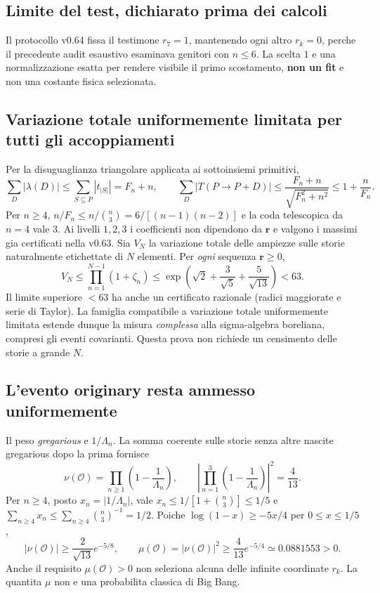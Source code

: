 \documentclass[11pt,a4paper]{article}
\begin{document}
\subsection*{Limite del test, dichiarato prima dei calcoli}
Il protocollo v0.64 fissa il testimone $r_7=1$, mantenendo ogni altro $r_k=0$, perche il precedente audit esaustivo esaminava genitori con $n\le6$. La scelta $1$ e una normalizzazione esatta per rendere visibile il primo scostamento, \textbf{non un fit} e non una costante fisica selezionata.

\clearpage
\subsection*{Variazione totale uniformemente limitata per tutti gli accoppiamenti}
Per la disuguaglianza triangolare applicata ai sottoinsiemi primitivi,
\begin{equation}
\sum_D |\lambda(D)|\le\sum_{S\subseteq P}|t_{|S|}|=F_n+n,\qquad
\sum_D|T(P\to P+D)|\le\frac{F_n+n}{\sqrt{F_n^2+n^2}}\le1+\frac n{F_n}.\tag{FN.4}
\end{equation}
Per $n\ge4$, $n/F_n\le n/\binom n3=6/[(n-1)(n-2)]$ e la coda telescopica da $n=4$ vale $3$. Ai livelli $1,2,3$ i coefficienti non dipendono da $\boldsymbol r$ e valgono i massimi gia certificati nella v0.63. Sia $V_N$ la variazione totale delle ampiezze sulle storie naturalmente etichettate di $N$ elementi. Per \emph{ogni} sequenza $\boldsymbol r\ge0$,
\begin{equation}
\boxed{V_N\le\prod_{n=1}^{N-1}(1+\zeta_n)
\le\exp\!\left(\sqrt2+\frac3{\sqrt5}+\frac5{\sqrt{13}}\right)<63.}\tag{FN.5}
\end{equation}
Il limite superiore $<63$ ha anche un certificato razionale (radici maggiorate e serie di Taylor). La famiglia compatibile a variazione totale uniformemente limitata estende dunque la misura \emph{complessa} alla sigma-algebra boreliana, compresi gli eventi covarianti. Questa prova non richiede un censimento delle storie a grande $N$.

\subsection*{L'evento originary resta ammesso uniformemente}
Il peso \emph{gregarious} e $1/\Lambda_n$. La somma coerente sulle storie senza altre nascite gregarious dopo la prima fornisce
\begin{equation}
\nu(\mathcal O)=\prod_{n\ge1}\left(1-\frac1{\Lambda_n}\right),\qquad
\left|\prod_{n=1}^3\left(1-\frac1{\Lambda_n}\right)\right|^2=\frac4{13}.\tag{FN.6}
\end{equation}
Per $n\ge4$, posto $x_n=|1/\Lambda_n|$, vale $x_n\le1/[1+\binom n3]\le1/5$ e
$\sum_{n\ge4}x_n\le\sum_{n\ge4}\binom n3^{-1}=1/2$. Poiche $\log(1-x)\ge-5x/4$ per $0\le x\le1/5$,
\begin{equation}
\boxed{|\nu(\mathcal O)|\ge\frac2{\sqrt{13}}e^{-5/8},\qquad
\mu(\mathcal O)=|\nu(\mathcal O)|^2\ge\frac4{13}e^{-5/4}\simeq0.0881553>0.}\tag{FN.7}
\end{equation}
Anche il requisito $\mu(\mathcal O)>0$ non seleziona alcuna delle infinite coordinate $r_k$. La quantita $\mu$ non e una probabilita classica di Big Bang.
\end{document}
